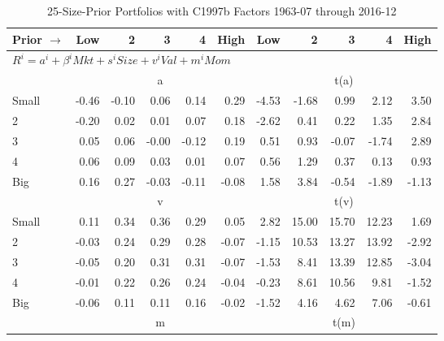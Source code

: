 
\begin{table}[!ht]
\centering
\caption{25-Size-Prior Portfolios with C1997b Factors 1963-07 through 2016-12}
\begin{tabular}{lrrrrrrrrrr}
  \toprule
    Prior $\rightarrow$ & Low & 2 & 3 & 4 & High & Low & 2 & 3 & 4 & High \\ 
  \midrule
  \multicolumn{11}{l}{$R^i=a^i+\beta^iMkt+s^iSize+v^iVal+m^iMom$} \\

  
    
      & \multicolumn{5}{c}{a} & \multicolumn{5}{c}{t(a)}
    
    \\
      \cmidrule(r){2-6} \cmidrule(r){7-11}

    Small   & -0.46  & -0.10  & 0.06  & 0.14  & 0.29  & -4.53  & -1.68  & 0.99  & 2.12  & 3.50  \\
         2  & -0.20  & 0.02  & 0.01  & 0.07  & 0.18  & -2.62  & 0.41  & 0.22  & 1.35  & 2.84  \\
         3  & 0.05  & 0.06  & -0.00  & -0.12  & 0.19  & 0.51  & 0.93  & -0.07  & -1.74  & 2.89  \\
         4  & 0.06  & 0.09  & 0.03  & 0.01  & 0.07  & 0.56  & 1.29  & 0.37  & 0.13  & 0.93  \\
    Big     & 0.16  & 0.27  & -0.03  & -0.11  & -0.08  & 1.58  & 3.84  & -0.54  & -1.89  & -1.13  \\

  
    
      & \multicolumn{5}{c}{v} & \multicolumn{5}{c}{t(v)}
    
    \\
      \cmidrule(r){2-6} \cmidrule(r){7-11}

    Small   & 0.11  & 0.34  & 0.36  & 0.29  & 0.05  & 2.82  & 15.00  & 15.70  & 12.23  & 1.69  \\
         2  & -0.03  & 0.24  & 0.29  & 0.28  & -0.07  & -1.15  & 10.53  & 13.27  & 13.92  & -2.92  \\
         3  & -0.05  & 0.20  & 0.31  & 0.31  & -0.07  & -1.53  & 8.41  & 13.39  & 12.85  & -3.04  \\
         4  & -0.01  & 0.22  & 0.26  & 0.24  & -0.04  & -0.23  & 8.61  & 10.56  & 9.81  & -1.52  \\
    Big     & -0.06  & 0.11  & 0.11  & 0.16  & -0.02  & -1.52  & 4.16  & 4.62  & 7.06  & -0.61  \\

  
    
      & \multicolumn{5}{c}{m} & \multicolumn{5}{c}{t(m)}
    

\end{tabular}
\end{table}
